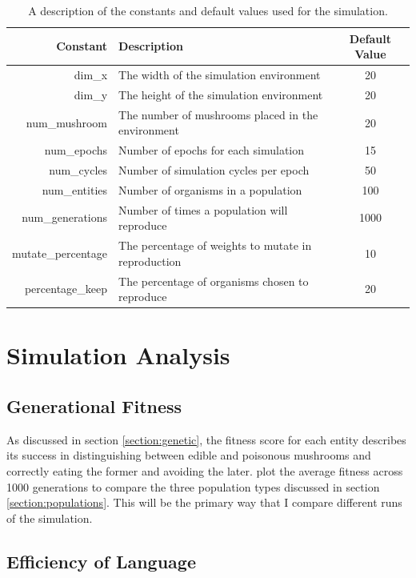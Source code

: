 \documentclass[12pt,a4paper,twoside,openright]{report}
\begin{document}
\begin{table}[t]
\centering
 \begin{tabular}{ r | l | c}
 \bf{Constant} & \bf{Description} & \bf{Default Value} \\ [0.5ex] 
 \hline
dim\_x & The width of the simulation environment & 20 \\
dim\_y & The height of the simulation environment & 20 \\
num\_mushroom & The number of mushrooms placed in the environment & 20 \\
num\_epochs &  Number of epochs for each simulation & 15 \\ 
num\_cycles & Number of simulation cycles per epoch & 50 \\
num\_entities & Number of organisms in a population & 100 \\
num\_generations & Number of times a population will reproduce & 1000 \\
mutate\_percentage & The percentage of weights to mutate in reproduction & 10 \\
percentage\_keep & The percentage of organisms chosen to reproduce & 20 \\
\end{tabular}
\caption{A description of the constants and default values used for the simulation.}
\label{table:constants}
\end{table}

\section{Simulation Analysis}\label{section:analysis}

\subsection{Generational Fitness}

As discussed in section \ref{section:genetic}, the fitness score for each entity describes its success in distinguishing between edible and poisonous mushrooms and correctly eating the former and avoiding the later. \cite{Cangelosi1998} plot the average fitness across 1000 generations to compare the three population types discussed in section \ref{section:populations}. This will be the primary way that I compare different runs of the simulation.

\subsection{Efficiency of Language}
\end{document}
